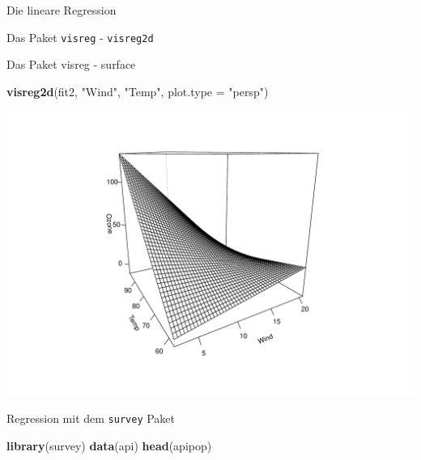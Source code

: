 \documentclass[ignorenonframetext,]{beamer}
\newenvironment{Shaded}{}{}
\newcommand{\KeywordTok}[1]{\textcolor[rgb]{0.00,0.44,0.13}{\textbf{{#1}}}}
\newcommand{\DataTypeTok}[1]{\textcolor[rgb]{0.56,0.13,0.00}{{#1}}}
\newcommand{\StringTok}[1]{\textcolor[rgb]{0.25,0.44,0.63}{{#1}}}
\newcommand{\NormalTok}[1]{{#1}}
\begin{document}
\begin{frame}[fragile]{Die lineare Regression}
\begin{block}{Das Paket \texttt{visreg} - \texttt{visreg2d}}
\end{block}

\begin{block}{Das Paket visreg - surface}

\begin{Shaded}
\begin{Highlighting}[]
\KeywordTok{visreg2d}\NormalTok{(fit2, }\StringTok{"Wind"}\NormalTok{, }\StringTok{"Temp"}\NormalTok{, }\DataTypeTok{plot.type =} \StringTok{"persp"}\NormalTok{)}
\end{Highlighting}
\end{Shaded}

\includegraphics{R_intern_files/figure-beamer/unnamed-chunk-314-1.pdf}

\end{block}

\begin{block}{Regression mit dem \texttt{survey} Paket}

\begin{Shaded}
\begin{Highlighting}[]
\KeywordTok{library}\NormalTok{(survey)}
\KeywordTok{data}\NormalTok{(api)}
\KeywordTok{head}\NormalTok{(apipop)}
\end{Highlighting}
\end{Shaded}


\end{block}
\end{frame}
\end{document}
